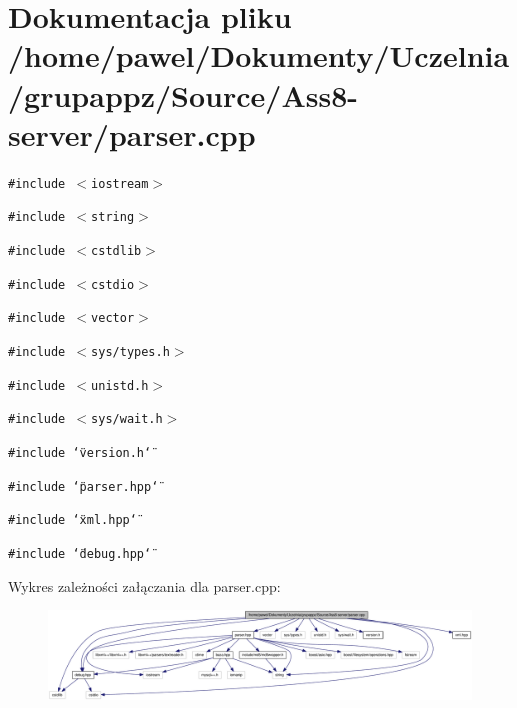 \hypertarget{a00014}{
\section{Dokumentacja pliku /home/pawel/Dokumenty/Uczelnia/grupappz/Source/Ass8-server/parser.cpp}
\label{d2/de7/a00014}
}
{\tt \#include $<$iostream$>$}\par
{\tt \#include $<$string$>$}\par
{\tt \#include $<$cstdlib$>$}\par
{\tt \#include $<$cstdio$>$}\par
{\tt \#include $<$vector$>$}\par
{\tt \#include $<$sys/types.h$>$}\par
{\tt \#include $<$unistd.h$>$}\par
{\tt \#include $<$sys/wait.h$>$}\par
{\tt \#include \char`\"{}version.h\char`\"{}}\par
{\tt \#include \char`\"{}parser.hpp\char`\"{}}\par
{\tt \#include \char`\"{}xml.hpp\char`\"{}}\par
{\tt \#include \char`\"{}debug.hpp\char`\"{}}\par


Wykres zależności załączania dla parser.cpp:\nopagebreak
\begin{figure}[H]
\begin{center}
\leavevmode
\includegraphics[width=420pt]{d6/d2d/a00047}
\end{center}
\end{figure}
